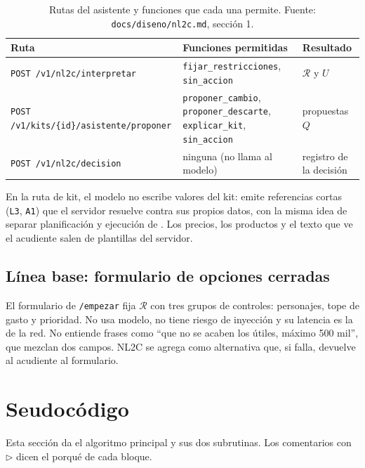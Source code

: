 \documentclass[11pt,letterpaper]{article}
\newcommand{\R}{\mathcal{R}}
\newcommand{\cod}[1]{\texttt{#1}}
\begin{document}
\begin{table}[ht]
\centering\small
\begin{tabular}{@{}L{5.6cm}L{5.2cm}L{2.6cm}@{}}\toprule
Ruta & Funciones permitidas & Resultado\\\midrule
\cod{POST /v1/nl2c/interpretar} & \cod{fijar\_restricciones}, \cod{sin\_accion} & $\R$ y $U$\\
\cod{POST /v1/kits/\{id\}/asistente/proponer} & \cod{proponer\_cambio}, \cod{proponer\_descarte}, \cod{explicar\_kit}, \cod{sin\_accion} & propuestas $Q$\\
\cod{POST /v1/nl2c/decision} & ninguna (no llama al modelo) & registro de la decisi\'on\\\bottomrule
\end{tabular}
\caption{Rutas del asistente y funciones que cada una permite. Fuente: \cod{docs/diseno/nl2c.md}, secci\'on 1.}
\label{tab:rutas}
\end{table}

En la ruta de kit, el modelo no escribe valores del kit: emite referencias cortas (\cod{L3}, \cod{A1}) que el
servidor resuelve contra sus propios datos, con la misma idea de separar planificaci\'on y ejecuci\'on de
\citet{debenedetti2025camel}. Los precios, los productos y el texto que ve el acudiente salen de plantillas del
servidor.

\subsection{L\'inea base: formulario de opciones cerradas}

El formulario de \cod{/empezar} fija $\R$ con tres grupos de controles: personajes, tope de gasto y prioridad.
No usa modelo, no tiene riesgo de inyecci\'on y su latencia es la de la red. No entiende frases como
\enquote{que no se acaben los \'utiles, m\'aximo 500 mil}, que mezclan dos campos. NL2C se agrega como alternativa
que, si falla, devuelve al acudiente al formulario.

\section{Seudoc\'odigo}\label{sec:seudo}

Esta secci\'on da el algoritmo principal y sus dos subrutinas. Los comentarios con $\triangleright$ dicen el
porqu\'e de cada bloque.
\end{document}
